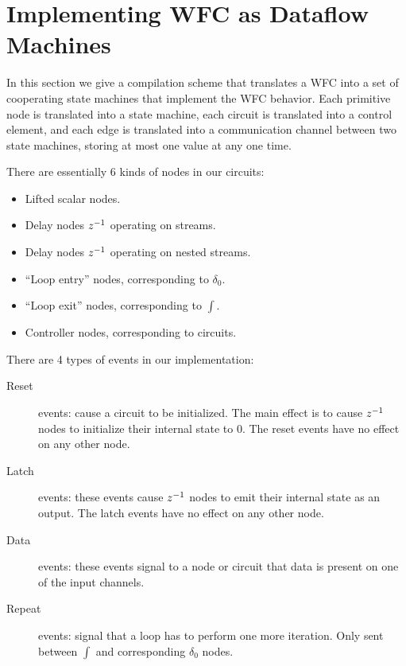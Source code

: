\section{Implementing WFC as Dataflow Machines}

In this section we give a compilation scheme that translates a WFC into a
set of cooperating state machines that implement the WFC behavior.
Each primitive node is translated into a state machine, each circuit
is translated into a control element, and each edge is translated into
a communication channel between two state machines, storing at most one value at
any one time.  

There are essentially 6 kinds of nodes in our circuits:

\begin{itemize}
    \item Lifted scalar nodes.
    \item Delay nodes $z^{-1}$ operating on streams. 
    \item Delay nodes $z^{-1}$ operating on nested streams.
    \item ``Loop entry'' nodes, corresponding to $\delta_0$.
    \item ``Loop exit'' nodes, corresponding to $\int$.
    \item Controller nodes, corresponding to circuits.
\end{itemize}

There are 4 types of events in our implementation:

\begin{description}
\item[Reset] events: cause a circuit to be initialized.  The main
effect is to cause $z^{-1}$ nodes to initialize their internal state to 0.
The reset events have no effect on any other node.
\item[Latch] events: these events cause $z^{-1}$ nodes to emit their
internal state as an output.  The latch events have no effect on
any other node.
\item[Data] events: these events signal to a node or circuit that data is
present on one of the input channels.
\item[Repeat] events: signal that a loop has to perform one more iteration.
Only sent between $\int$ and corresponding $\delta_0$ nodes.
\end{description}

